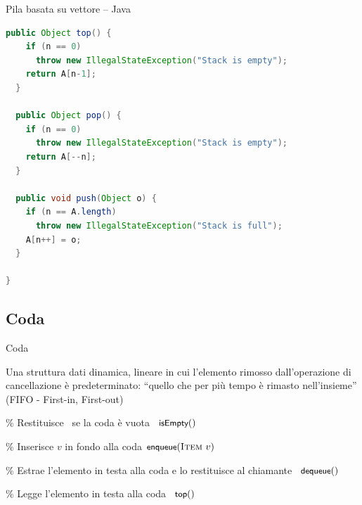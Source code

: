\begin{frame}[fragile,shrink=5]{Pila basata su vettore -- Java}

\vspace{-6pt}
\begin{lstlisting}[language=java]
  public Object top() { 
    if (n == 0) 
      throw new IllegalStateException("Stack is empty");
    return A[n-1]; 
  }

  public Object pop() {
    if (n == 0) 
      throw new IllegalStateException("Stack is empty");
    return A[--n];
  }

  public void push(Object o) {
    if (n == A.length) 
      throw new IllegalStateException("Stack is full");
    A[n++] = o;
  }
  
}
\end{lstlisting}
  
  
\end{frame}


\subsection{Coda}

\begin{frame}[shrink=10]{Coda}
  
\begin{myboxtitle}
Una struttura dati dinamica, lineare in cui l'elemento rimosso dall'operazione
di cancellazione è predeterminato: “quello che per più tempo è rimasto
nell'insieme” (\alert{FIFO - First-in, First-out})
\end{myboxtitle}

\begin{Procedure}
\caption[A]{\Queue}

\% Restituisce \TRUE\ se la coda è vuota\;
\alert{\BOOLEAN\ $\textsf{{\small isEmpty}}()$\;}
\BlankLine

\% Inserisce $v$ in fondo alla coda\;
\alert{$\textsf{{\small enqueue}}(\textsc{Item}\ v)$\;}
\BlankLine

\% Estrae l'elemento in testa alla coda e lo restituisce al chiamante\;
\alert{\Item\ $\textsf{{\small dequeue}}()$\;}
\BlankLine

\% Legge l'elemento in testa alla coda\;
\alert{\Item\ $\textsf{{\small top}}()$\;}
\end{Procedure}


\end{frame}

